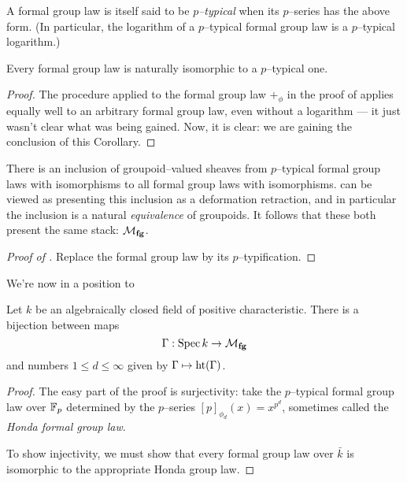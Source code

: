 
\begin{definition}
A formal group law is itself said to be \textit{$p$--typical} when its $p$--series has the above form.  (In particular, the logarithm of a $p$--typical formal group law is a $p$--typical logarithm.)
\end{definition}

\begin{corollary}\label{EveryFGLIsPTypical}
Every formal group law is naturally isomorphic to a $p$--typical one.
\end{corollary}
\begin{proof}
The procedure applied to the formal group law $+_\phi$ in the proof of  applies equally well to an arbitrary formal group law, even without a logarithm --- it just wasn't clear what was being gained.  Now, it is clear: we are gaining the conclusion of this Corollary.
\end{proof}

\begin{remark}
There is an inclusion of groupoid--valued sheaves from $p$--typical formal group laws with isomorphisms to all formal group laws with isomorphisms.   can be viewed as presenting this inclusion as a deformation retraction, and in particular the inclusion is a natural \emph{equivalence} of groupoids.  It follows that these both present the same stack: $\mathcal{M}_{\mathbf{fg}}$.
\end{remark}

\begin{proof}[{Proof of }]
Replace the formal group law by its $p$--typification.  
\end{proof}

We're now in a position to 
\begin{theorem}
Let $k$ be an algebraically closed field of positive characteristic.  There is a bijection between maps \[\Gamma: \operatorname{Spec} k \to \mathcal{M}_{\mathbf{fg}}\] and numbers $1 \le d \le \infty$ given by $\Gamma \mapsto \operatorname{ht}(\Gamma)$.
\end{theorem}
\begin{proof}
The easy part of the proof is surjectivity: take the $p$--typical formal group law over $\mathbb F_p$ determined by the $p$--series $[p]_{\phi_d}(x) = x^{p^d}$, sometimes called the \textit{Honda formal group law}.

To show injectivity, we must show that every formal group law over $\bar k$ is isomorphic to the appropriate Honda group law. 
\end{proof}

